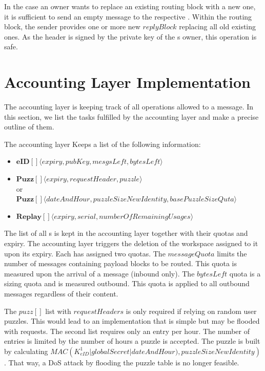 In the case an owner wants to replace an existing routing block with a new one, it is sufficient to send an empty message to the respective . Within the routing block, the sender provides one or more new $replyBlock$ replacing all old existing ones. As the header is signed by the private key of the s owner, this operation is safe.

\chapter{Accounting Layer Implementation}\label{sec:accountingImplementation}
The accounting layer is keeping track of all operations allowed to a message. In this section, we list the tasks fulfilled by the accounting layer and make a precise outline of them.

The accounting layer Keeps a list of the following information:
\begin{itemize}
	\item $\mathbf{eID[]}\langle expiry, pubKey, mesgsLeft, bytesLeft \rangle$\\
	\item $\mathbf{Puzz[]}\langle expiry, requestHeader, puzzle \rangle$\\
	or\\
	$\mathbf{Puzz[]}\langle dateAndHour, puzzleSizeNewIdentity, basePuzzleSizeQuta \rangle$\\
	\item $\mathbf{Replay[]}\langle expiry, serial, numberOfRemainingUsages \rangle$\\
\end{itemize}

The list of all s is kept in the accounting layer together with their quotas and expiry. The accounting layer triggers the deletion of the workspace assigned to it upon its expiry. Each  has assigned two quotas. The $messageQuota$ limits the number of messages containing payload blocks to be routed. This quota is measured upon the arrival of a message (inbound only). The $bytesLeft$ quota is a sizing quota and is measured outbound. This quota is applied to all outbound messages regardless of their content.

The $puzz[]$ list with $requestHeaders$ is only required if relying on random user puzzles. This would lead to an implementation that is simple but may be flooded with  requests. The second list requires only an entry per hour. The number of entries is limited by the number of hours a puzzle is accepted. The puzzle is built by calculating  $MAC\left(K^1_{eID} | globalSecret | dateAndHour ), puzzleSizeNewIdentity\right)$. That way, a DoS attack by flooding the puzzle table is no longer feasible.


